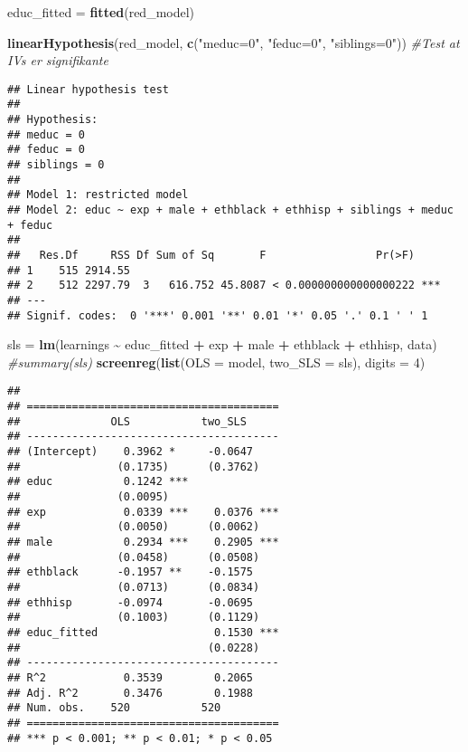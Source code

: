 \documentclass[
]{article}
\newenvironment{Shaded}{\begin{snugshade}}{\end{snugshade}}
\newcommand{\AttributeTok}[1]{\textcolor[rgb]{0.13,0.29,0.53}{#1}}
\newcommand{\CommentTok}[1]{\textcolor[rgb]{0.56,0.35,0.01}{\textit{#1}}}
\newcommand{\DecValTok}[1]{\textcolor[rgb]{0.00,0.00,0.81}{#1}}
\newcommand{\FunctionTok}[1]{\textcolor[rgb]{0.13,0.29,0.53}{\textbf{#1}}}
\newcommand{\NormalTok}[1]{#1}
\newcommand{\OtherTok}[1]{\textcolor[rgb]{0.56,0.35,0.01}{#1}}
\newcommand{\SpecialCharTok}[1]{\textcolor[rgb]{0.81,0.36,0.00}{\textbf{#1}}}
\newcommand{\StringTok}[1]{\textcolor[rgb]{0.31,0.60,0.02}{#1}}
\begin{document}
\begin{Shaded}
\begin{Highlighting}[]
\NormalTok{educ\_fitted }\OtherTok{=} \FunctionTok{fitted}\NormalTok{(red\_model)}

\FunctionTok{linearHypothesis}\NormalTok{(red\_model, }\FunctionTok{c}\NormalTok{(}\StringTok{"meduc=0"}\NormalTok{, }\StringTok{"feduc=0"}\NormalTok{, }\StringTok{"siblings=0"}\NormalTok{)) }\CommentTok{\#Test at IVs er signifikante}
\end{Highlighting}
\end{Shaded}

\begin{verbatim}
## Linear hypothesis test
## 
## Hypothesis:
## meduc = 0
## feduc = 0
## siblings = 0
## 
## Model 1: restricted model
## Model 2: educ ~ exp + male + ethblack + ethhisp + siblings + meduc + feduc
## 
##   Res.Df     RSS Df Sum of Sq       F                 Pr(>F)    
## 1    515 2914.55                                                
## 2    512 2297.79  3   616.752 45.8087 < 0.000000000000000222 ***
## ---
## Signif. codes:  0 '***' 0.001 '**' 0.01 '*' 0.05 '.' 0.1 ' ' 1
\end{verbatim}

\begin{Shaded}
\begin{Highlighting}[]
\NormalTok{sls }\OtherTok{=} \FunctionTok{lm}\NormalTok{(learnings }\SpecialCharTok{\textasciitilde{}}\NormalTok{ educ\_fitted }\SpecialCharTok{+}\NormalTok{ exp }\SpecialCharTok{+}\NormalTok{ male }\SpecialCharTok{+}\NormalTok{ ethblack }\SpecialCharTok{+}\NormalTok{ ethhisp, data)}
\CommentTok{\#summary(sls)}
\FunctionTok{screenreg}\NormalTok{(}\FunctionTok{list}\NormalTok{(}\AttributeTok{OLS =}\NormalTok{ model, }\AttributeTok{two\_SLS =}\NormalTok{ sls), }\AttributeTok{digits =} \DecValTok{4}\NormalTok{)}
\end{Highlighting}
\end{Shaded}

\begin{verbatim}
## 
## =======================================
##              OLS           two_SLS     
## ---------------------------------------
## (Intercept)    0.3962 *     -0.0647    
##               (0.1735)      (0.3762)   
## educ           0.1242 ***              
##               (0.0095)                 
## exp            0.0339 ***    0.0376 ***
##               (0.0050)      (0.0062)   
## male           0.2934 ***    0.2905 ***
##               (0.0458)      (0.0508)   
## ethblack      -0.1957 **    -0.1575    
##               (0.0713)      (0.0834)   
## ethhisp       -0.0974       -0.0695    
##               (0.1003)      (0.1129)   
## educ_fitted                  0.1530 ***
##                             (0.0228)   
## ---------------------------------------
## R^2            0.3539        0.2065    
## Adj. R^2       0.3476        0.1988    
## Num. obs.    520           520         
## =======================================
## *** p < 0.001; ** p < 0.01; * p < 0.05
\end{verbatim}
\end{document}
